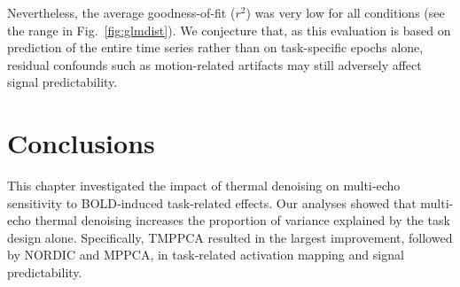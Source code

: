 Nevertheless, the average goodness-of-fit ($r^2$) was very low for all conditions (see the range in Fig.~\ref{fig:glmdist}). We conjecture that, as this evaluation is based on prediction of the entire time series rather than on task-specific epochs alone, residual confounds such as motion-related artifacts may still adversely affect signal predictability.

\section{Conclusions}
 
This chapter investigated the impact of thermal denoising on multi‑echo sensitivity to BOLD‑induced task-related effects. Our analyses showed that multi-echo thermal denoising increases the proportion of variance explained by the task design alone. Specifically, TMPPCA resulted in the largest improvement, followed by NORDIC and MPPCA, in task-related activation mapping and signal predictability.

 

